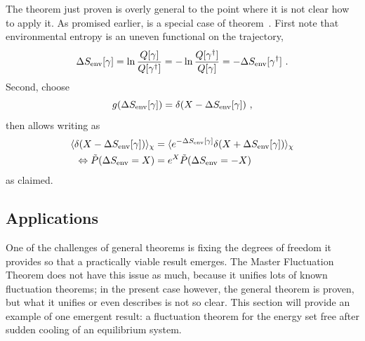 The theorem just proven is overly general to the point where it is not clear how to apply it. As promised earlier,  is a special case of theorem~. First note that environmental entropy is an uneven functional on the trajectory,
\begin{equation}
	  \Delta S_\text{env}[\gamma]
	= \ln\frac{Q[\gamma]}{Q[\gamma^\dagger]}
	= -\ln\frac{Q[\gamma^\dagger]}{Q[\gamma]}
	= -\Delta S_\text{env}[\gamma^\dagger] ~.
\end{equation}
%
Second, choose
\begin{equation}
	g(\Delta S_\text{env}[\gamma]) = \delta(X - \Delta S_\text{env}[\gamma]) ~,
\end{equation}
%
then  allows writing  as
%
\begin{align*}
		\langle \delta(X - \Delta S_\text{env}[\gamma])\rangle_\chi
		&=
		\langle e^{-\Delta S_\text{env}[\gamma]}\delta(X + \Delta S_\text{env}[\gamma])\rangle_\chi
	\\ \Leftrightarrow
		\tilde P(\Delta S_\text{env} = X)
		&=
		e^X \tilde P(\Delta S_\text{env} = -X)
\end{align*}
%
as claimed.





\subsection{Applications}
\label{sec:thingie-applications}

One of the challenges of general theorems is fixing the degrees of freedom it provides so that a practically viable result emerges. The Master Fluctuation Theorem \cite{seifert-review} does not have this issue as much, because it unifies lots of known fluctuation theorems; in the present case however, the general theorem is proven, but what it unifies or even describes is not so clear. This section will provide an example of one emergent result: a fluctuation theorem for the energy set free after sudden cooling of an equilibrium system.

